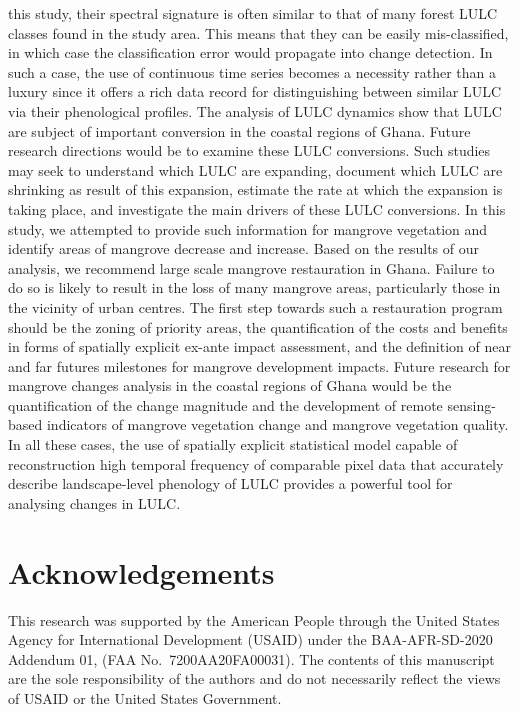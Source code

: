 \documentclass[12pt,oneside,preprint,3p,authoryear,times]{elsarticle} %
\begin{document}
this study, their spectral signature is often similar to that of many
forest LULC classes found in the study area. This means that they can be
easily mis-classified, in which case the classification error would
propagate into change detection. In such a case, the use of continuous
time series becomes a necessity rather than a luxury since it offers a
rich data record for distinguishing between similar LULC via their
phenological profiles. The analysis of LULC dynamics show that LULC are
subject of important conversion in the coastal regions of Ghana. Future
research directions would be to examine these LULC conversions. Such
studies may seek to understand which LULC are expanding, document which
LULC are shrinking as result of this expansion, estimate the rate at
which the expansion is taking place, and investigate the main drivers of
these LULC conversions. In this study, we attempted to provide such
information for mangrove vegetation and identify areas of mangrove
decrease and increase. Based on the results of our analysis, we
recommend large scale mangrove restauration in Ghana. Failure to do so
is likely to result in the loss of many mangrove areas, particularly
those in the vicinity of urban centres. The first step towards such a
restauration program should be the zoning of priority areas, the
quantification of the costs and benefits in forms of spatially explicit
ex-ante impact assessment, and the definition of near and far futures
milestones for mangrove development impacts. Future research for
mangrove changes analysis in the coastal regions of Ghana would be the
quantification of the change magnitude and the development of remote
sensing-based indicators of mangrove vegetation change and mangrove
vegetation quality. In all these cases, the use of spatially explicit
statistical model capable of reconstruction high temporal frequency of
comparable pixel data that accurately describe landscape-level phenology
of LULC provides a powerful tool for analysing changes in LULC.

\hypertarget{acknowledgements}{%
\section*{Acknowledgements}\label{acknowledgements}}

This research was supported by the American People through the United
States Agency for International Development (USAID) under the
BAA-AFR-SD-2020 Addendum 01, (FAA No.~7200AA20FA00031). The contents of
this manuscript are the sole responsibility of the authors and do not
necessarily reflect the views of USAID or the United States Government.

\renewcommand\refname{References}

\end{document}
